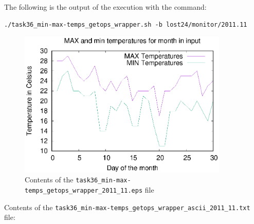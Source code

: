 \documentclass[9pt]{article}
\begin{document}
\begin{enumerate}
		The following is the output of the execution with the command:
		\begin{lstlisting}
./task36_min-max-temps_getops_wrapper.sh -b lost24/monitor/2011.11 
		\end{lstlisting}
		
		\begin{figure}[h!]
			\centering
			\includegraphics[width=10cm]{../task36_min-max-temps_getops_wrapper_2011_11.eps}
			\caption{Contents of the \texttt{task36\_min-max-temps\_getops\_wrapper\_2011\_11.eps} file}
		\end{figure}		

		Contents of the \texttt{task36\_min-max-temps\_getops\_wrapper\_ascii\_2011\_11.txt} file:
	
\end{enumerate}
\end{document}
